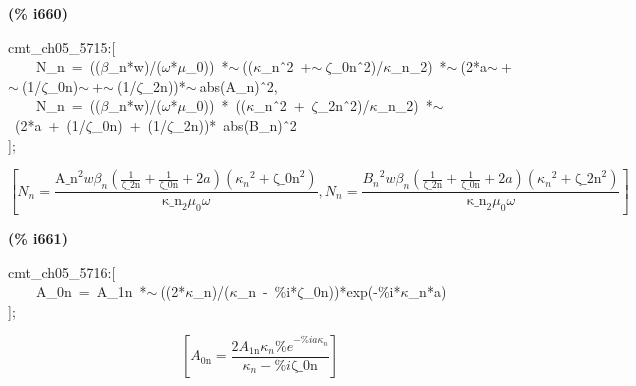 \documentclass[fleqn]{article}
\begin{document}
\noindent
\begin{minipage}[t]{4.000000em}\color{red}\bfseries
(\% i660)	
\end{minipage}
\begin{minipage}[t]{\textwidth}\color{blue}
cmt\_ch05\_5715:[\\
\ \ \ \ N\_n\ =\ ((\ensuremath{\beta}\_n*w)/(\ensuremath{\omega}*\ensuremath{\mu}\_0))\ *\ensuremath{\sim\ }((\ensuremath{\kappa}\_n\^\ 2\ +\ensuremath{\sim\ }\ensuremath{\zeta}\_0n\^\ 2)/\ensuremath{\kappa}\_n\_2)\ *\ensuremath{\sim\ }(2*a\ensuremath{\sim\ }+\ensuremath{\sim\ }(1/\ensuremath{\zeta}\_0n)\ensuremath{\sim\ }+\ensuremath{\sim\ }(1/\ensuremath{\zeta}\_2n))*\ensuremath{\sim\ }abs(A\_n)\^\ 2,\\
\ \ \ \ N\_n\ =\ ((\ensuremath{\beta}\_n*w)/(\ensuremath{\omega}*\ensuremath{\mu}\_0))\ *\ ((\ensuremath{\kappa}\_n\^\ 2\ +\ \ensuremath{\zeta}\_2n\^\ 2)/\ensuremath{\kappa}\_n\_2)\ *\ensuremath{\sim\ }\ (2*a\ +\ (1/\ensuremath{\zeta}\_0n)\ +\ (1/\ensuremath{\zeta}\_2n))*\ abs(B\_n)\^\ 2\\
];
\end{minipage}
\[\displaystyle \tag{\% o660} 
\operatorname{[}{N_n}=\frac{{{\ensuremath{\mathrm{A\_ n}}}^{2}} w {{\beta }_n} \left( \frac{1}{\ensuremath{\mathrm{\zeta \_ 2n}}}+\frac{1}{\ensuremath{\mathrm{\zeta \_ 0n}}}+2 a\right)  \left( {{{{\kappa }_n}}^{2}}+{{\ensuremath{\mathrm{\zeta \_ 0n}}}^{2}}\right) }{{{\ensuremath{\mathrm{\kappa \_ n}}}_2} {{\mu }_0} \omega }\operatorname{,}{N_n}=
\frac{{{{B_n}}^{2}} w {{\beta }_n} \left( \frac{1}{\ensuremath{\mathrm{\zeta \_ 2n}}}+\frac{1}{\ensuremath{\mathrm{\zeta \_ 0n}}}+2 a\right)  \left( {{{{\kappa }_n}}^{2}}+{{\ensuremath{\mathrm{\zeta \_ 2n}}}^{2}}\right) }{{{\ensuremath{\mathrm{\kappa \_ n}}}_2} {{\mu }_0} \omega }\operatorname{]}\mbox{}
\]


\noindent
\begin{minipage}[t]{4.000000em}\color{red}\bfseries
(\% i661)	
\end{minipage}
\begin{minipage}[t]{\textwidth}\color{blue}
cmt\_ch05\_5716:[\\
\ \ \ \ A\_0n\ =\ A\_1n\ *\ensuremath{\sim\ }((2*\ensuremath{\kappa}\_n)/(\ensuremath{\kappa}\_n\ -\ \%i*\ensuremath{\zeta}\_0n))*exp(-\%i*\ensuremath{\kappa}\_n*a)\\
];
\end{minipage}
\[\displaystyle \tag{\% o661} 
\left[ {A_{\ensuremath{\mathrm{0n}}}}=\frac{2 {A_{\ensuremath{\mathrm{1n}}}} {{\kappa }_n} {{\% e}^{-\% i a {{\kappa }_n}}}}{{{\kappa }_n}-\% i \ensuremath{\mathrm{\zeta \_ 0n}}}\right] \mbox{}
\]
\end{document}

